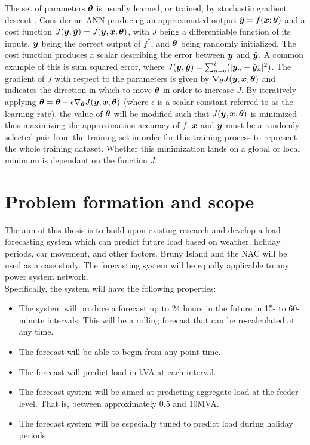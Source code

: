 \par
The set of parameters ${\bm{\theta}}$ is usually learned, or trained, by stochastic gradient descent \citep{Bottou2011}.
Consider an ANN producing an approximated output $\hat{{\bm{y}}} = f({\bm{x}}; {\bm{\theta}})$ and a cost function $J({\bm{y}}, \hat{{\bm{y}}}) = J({\bm{y}}, {\bm{x}}, {\bm{\theta}})$, with  $J$ being a differentiable function of its inputs, ${\bm{y}}$ being the correct output of $f^*$, and ${\bm{\theta}}$ being randomly initialized.
The cost function produces a scalar describing the error between ${\bm{y}}$ and $\hat{{\bm{y}}}$.
A common example of this is sum squared error, where $J({\bm{y}}, \hat{{\bm{y}}}) = \sum_{n=o}^{i}(|{\bm{y}}_n - \hat{{\bm{y}}}_n|^2)$.
The gradient of $J$ with respect to the parameters is given by $\nabla_{{\bm{\theta}}}J({\bm{y}}, {\bm{x}}, {\bm{\theta}})$ and indicates the direction in which to move ${\bm{\theta}}$ in order to increase $J$.
By iteratively applying ${\bm{\theta}} = {\bm{\theta}} - \epsilon \nabla_{{\bm{\theta}}}J({\bm{y}}, {\bm{x}}, {\bm{\theta}})$ (where $\epsilon$ is a scalar constant referred to as the learning rate), the value of ${\bm{\theta}}$ will be modified such that $J({\bm{y}}, {\bm{x}}, {\bm{\theta}})$ is minimized - thus maximizing the approximation accuracy of $f$.
${\bm{x}}$ and ${\bm{y}}$ must be a randomly selected pair from the training set in order for this training process to represent the whole training dataset.
Whether this minimization lands on a global or local minimum is dependant on the function $J$.
\par


\section{Problem formation and scope}
\label{scope}
The aim of this thesis is to build upon existing research and develop a load forecasting system which can predict future load based on weather, holiday periods, car movement, and other factors. 
Bruny Island and the NAC will be used as a case study. 
The forecasting system will be equally applicable to any power system network.
\\
Specifically, the system will have the following properties:
\begin{itemize}
	\item The system will produce a forecast up to 24 hours in the future in 15- to 60-minute intervals. This will be a rolling forecast that can be re-calculated at any time.
	\item The forecast will be able to begin from any point time.
	\item The forecast will predict load in kVA at each interval.
	\item The forecast system will be aimed at predicting aggregate load at the feeder level. That is, between approximately 0.5 and 10MVA.
	\item The forecast system will be especially tuned to predict load during holiday periods.
\end{itemize}
